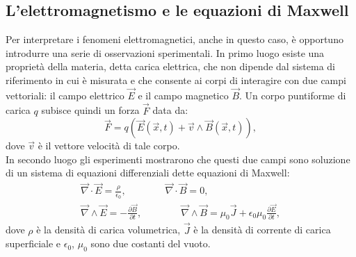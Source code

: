 \subsection{L'elettromagnetismo e le equazioni di Maxwell}\label{sec:EquazioniMaxwell}
Per interpretare i fenomeni elettromagnetici, anche in questo caso, è opportuno introdurre
una serie di osservazioni sperimentali. In primo luogo esiste una proprietà della materia, 
detta carica elettrica, che non dipende dal sistema di riferimento in cui è misurata e che consente 
ai corpi di interagire con due campi vettoriali: 
il campo elettrico $\vec{E}$ e il campo magnetico $\vec{B}$. Un corpo puntiforme di carica 
$q$ subisce quindi un forza $\vec{F}$ data da:
\begin{equation}
	\vec{F}=q(\vec{E}(\vec{x},t)+\vec{v}\wedge\vec{B}(\vec{x},t)),
	\label{ForzaLorentz}
\end{equation}
dove $\vec{v}$ è il vettore velocità di tale corpo.\\
In secondo luogo gli esperimenti mostrarono che questi due campi sono soluzione di un sistema di equazioni differenziali dette equazioni di Maxwell:
\begin{equation}
	\begin{gathered}
		\vec{\nabla}\cdot\vec{E}=\frac{\rho}{\epsilon_0}, \qquad \qquad \vec{\nabla}\cdot\vec{B}=0, \\
		\vec{\nabla}\wedge\vec{E}=-\frac{\partial\vec{B}}{\partial t}, \qquad \qquad \vec{\nabla}\wedge
		\vec{B}=\mu_0\vec{J}+\epsilon_0\mu_0\frac{\partial\vec{E}}{\partial t},
		\label{EquazioniMaxwell}
	\end{gathered}
\end{equation}
dove $\rho$ è la densità di carica volumetrica, $\vec{J}$ è la densità di corrente di carica superficiale e 
$\epsilon_0$, $\mu_0$ sono due costanti del vuoto.\\

